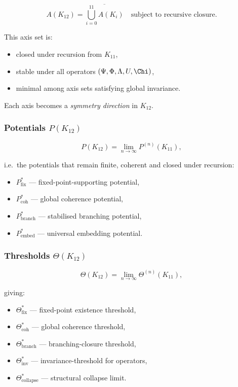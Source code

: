\[
A(K_{12}) =
\overline{\bigcup_{i=0}^{11} A(K_i)}
\quad \text{subject to recursive closure}.
\]

This axis set is:
\begin{itemize}
    \item closed under recursion from $K_{11}$,
    \item stable under all operators $(\Psi,\Phi,\Lambda,U,\Chi)$,
    \item minimal among axis sets satisfying global invariance.
\end{itemize}

Each axis becomes a \emph{symmetry direction} in $K_{12}$.

\subsubsection{Potentials $P(K_{12})$}

\[
P(K_{12}) = \lim_{n\to\infty} P^{(n)}(K_{11}),
\]

i.e.\ the potentials that remain finite, coherent and closed under recursion:
\begin{itemize}
    \item $P_{\mathrm{fix}}^*$ — fixed-point-supporting potential,
    \item $P_{\mathrm{coh}}^*$ — global coherence potential,
    \item $P_{\mathrm{branch}}^*$ — stabilised branching potential,
    \item $P_{\mathrm{embed}}^*$ — universal embedding potential.
\end{itemize}

\subsubsection{Thresholds $\Theta(K_{12})$}

\[
\Theta(K_{12}) =
\lim_{n\to\infty} \Theta^{(n)}(K_{11}),
\]

giving:
\begin{itemize}
    \item $\Theta^*_{\mathrm{fix}}$ — fixed-point existence threshold,
    \item $\Theta^*_{\mathrm{coh}}$ — global coherence threshold,
    \item $\Theta^*_{\mathrm{branch}}$ — branching-closure threshold,
    \item $\Theta^*_{\mathrm{inv}}$ — invariance-threshold for operators,
    \item $\Theta^*_{\mathrm{collapse}}$ — structural collapse limit.
\end{itemize}

